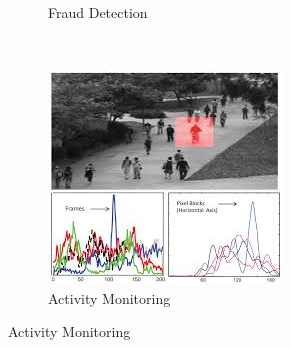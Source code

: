 \documentclass[notheorems]{beamer}
\begin{document}
\begin{frame}
\begin{figure}
\begin{subfigure}{0.33\textwidth}
		\caption{Fraud Detection}
	\end{subfigure}~~~~~
	\begin{subfigure}{0.33\textwidth}
		\includegraphics[width=\textwidth]{pic/activity_monitoring.jpg}
		\caption{Activity Monitoring}
	\end{subfigure}
\end{figure}  
\end{frame}
\end{document}
